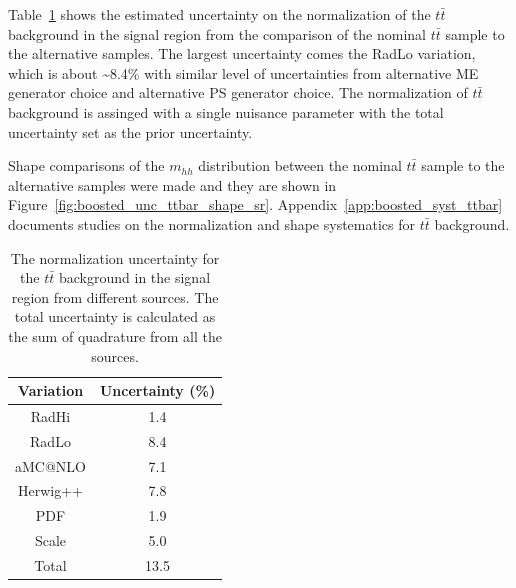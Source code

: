 Table~\ref{tab:boosted_unc_ttbar} shows the estimated uncertainty on the normalization of the $t\bar{t}$ background in the signal region
from the comparison of the nominal $t\bar{t}$ sample to the alternative samples. The largest uncertainty comes the RadLo variation,
which is about \textasciitilde8.4\% with similar level of uncertainties from alternative ME generator choice and alternative PS generator choice.
The normalization of $t\bar{t}$ background is assinged with a single nuisance parameter with the total uncertainty set as the prior uncertainty.
 
Shape comparisons of the $m_{hh}$ distribution between the nominal $t\bar{t}$ sample to the alternative samples were made and they are shown in
Figure~\ref{fig:boosted_unc_ttbar_shape_sr}. Appendix~\ref{app:boosted_syst_ttbar} documents studies on the normalization and shape systematics
for $t\bar{t}$ background.
 
\begin{table}[htbp!]
\begin{center}
\begin{tabular}{c|c}
Variation  &  Uncertainty (\%) \\
\hline
RadHi      &                 1.4 \\
RadLo      &                 8.4 \\
aMC@NLO    &                 7.1 \\
Herwig++   &                 7.8 \\
PDF        &                 1.9 \\
Scale      &                 5.0 \\
\hline
Total      &                13.5 \\
\end{tabular}
\end{center}
\caption{The normalization uncertainty for the $t\bar{t}$ background in the signal region
from different sources. The total uncertainty is calculated as the sum of quadrature from all
the sources.}
\label{tab:boosted_unc_ttbar}
\end{table}
 
